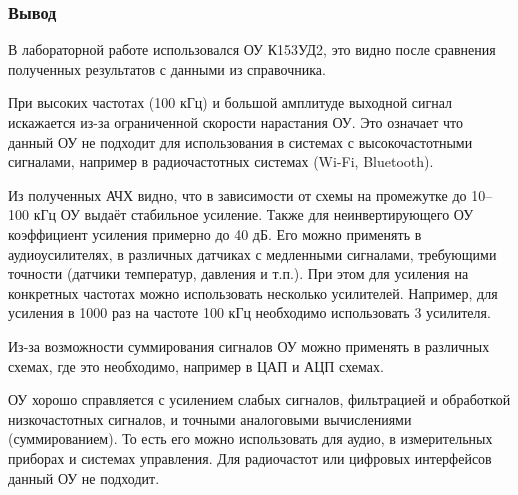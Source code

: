 \documentclass[a4paper, 12pt]{article}
\begin{document}
\subsubsection*{Вывод}

В лабораторной работе использовался ОУ К153УД2, это видно после сравнения полученных результатов с данными из справочника.

При высоких частотах (100 кГц) и большой амплитуде выходной сигнал искажается из-за ограниченной скорости нарастания ОУ. Это означает что данный ОУ не подходит для использования в системах с высокочастотными сигналами, например в радиочастотных системах (Wi-Fi, Bluetooth).

Из полученных АЧХ видно, что в зависимости от схемы на промежутке до 10–100 кГц ОУ выдаёт стабильное усиление. Также для неинвертирующего ОУ коэффициент усиления примерно до 40 дБ. Его можно применять в аудиоусилителях, в различных датчиках с медленными сигналами, требующими точности (датчики температур, давления и т.п.). При этом для усиления на конкретных частотах можно использовать несколько усилителей. Например, для усиления в 1000 раз на частоте 100 кГц необходимо использовать 3 усилителя.

Из-за возможности суммирования сигналов ОУ можно применять в различных схемах, где это необходимо, например в ЦАП и АЦП схемах.

ОУ хорошо справляется с усилением слабых сигналов, фильтрацией и обработкой низкочастотных сигналов, и точными аналоговыми вычислениями (суммированием). То есть его можно использовать для аудио, в измерительных приборах и системах управления. Для радиочастот или цифровых интерфейсов данный ОУ не подходит.
\end{document}
